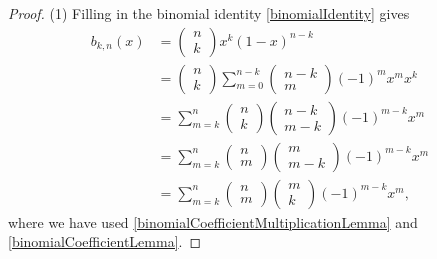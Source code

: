 \begin{proof}
(1) Filling in the binomial identity \ref{binomialIdentity} gives
\begin{align*}
b_{k,n}(x) &= \begin{pmatrix}
n \\ k
\end{pmatrix}x^k(1-x)^{n-k} \\
&= \begin{pmatrix}
n \\ k
\end{pmatrix}\sum_{m=0}^{n-k}\begin{pmatrix}
n-k \\ m
\end{pmatrix}(-1)^{m}x^mx^k \\
&= \sum_{m=k}^{n}\begin{pmatrix}
n \\ k
\end{pmatrix}\begin{pmatrix}
n-k \\ m-k
\end{pmatrix}(-1)^{m-k}x^m \\
&= \sum_{m=k}^{n}\begin{pmatrix}
n \\ m
\end{pmatrix}\begin{pmatrix}
m \\ m-k
\end{pmatrix}(-1)^{m-k}x^m \\
&= \sum_{m=k}^{n}\begin{pmatrix}
n \\ m
\end{pmatrix}\begin{pmatrix}
m \\ k
\end{pmatrix}(-1)^{m-k}x^m,
\end{align*}
where we have used \ref{binomialCoefficientMultiplicationLemma} and \ref{binomialCoefficientLemma}.


\end{proof}
